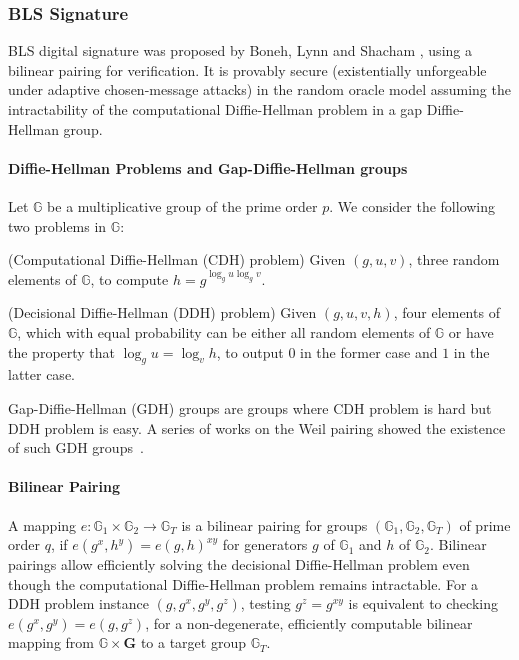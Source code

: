 \subsubsection{BLS Signature}
BLS digital signature was proposed by Boneh, Lynn and Shacham \cite{DBLP:journals/joc/BonehLS04}, using a bilinear pairing for verification. It is provably secure (existentially unforgeable under adaptive chosen-message attacks) in the random oracle model assuming the intractability of the computational Diffie-Hellman problem in a gap Diffie-Hellman group. 

\paragraph{Diffie-Hellman Problems and Gap-Diffie-Hellman groups} Let $\mathbb{G}$ be a multiplicative group of the prime order $p$. We consider the following two problems in $\mathbb{G}$:
\begin{definition} {(Computational Diffie-Hellman (CDH) problem)} 
    Given $(g, u, v)$, three random elements of $\mathbb{G}$, to compute $h=g^{\log_g u \log_g v}$. 
\end{definition}

\begin{definition} {(Decisional Diffie-Hellman (DDH) problem)}
    Given $(g, u, v, h)$, four elements of $\mathbb{G}$, which with equal probability can be either all random elements of $\mathbb{G}$ or have the property that $\log_g u = \log_v h$, to output $0$ in the former case and $1$ in the latter case. 
\end{definition}

Gap-Diffie-Hellman (GDH) groups are groups where CDH problem is hard but DDH problem is easy. A series of works on the Weil pairing showed the existence of such GDH groups~\cite{DBLP:conf/crypto/BonehF01}. 

\paragraph{Bilinear Pairing} A mapping $e: \mathbb{G}_1\times \mathbb{G}_2\to \mathbb{G}_T$ is a bilinear pairing for groups $(\mathbb{G}_1, \mathbb{G}_2, \mathbb{G}_T)$ of prime order $q$, if $e(g^x, h^y) = e(g, h)^{xy}$ for generators $g$ of $\mathbb{G}_1$ and $h$ of $\mathbb{G}_2$. Bilinear pairings allow efficiently solving the decisional Diffie-Hellman problem even though the computational Diffie-Hellman problem remains intractable. For a DDH problem instance $(g, g^x, g^y, g^z)$, testing $g^z=g^{xy}$ is equivalent to checking $e(g^x, g^y) = e(g, g^z)$, for a non-degenerate, efficiently computable bilinear mapping from $\mathbb{G}\times \mathbf{G}$ to a target group $\mathbb{G}_T$. 

